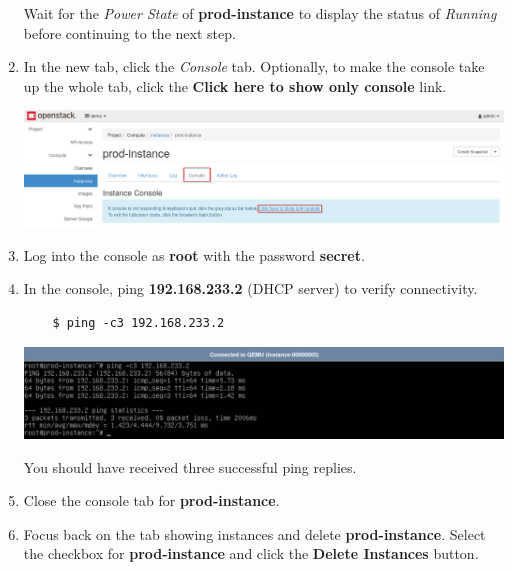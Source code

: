 \documentclass[letterpaper, 12pt]{article}
\begin{document}
\begin{enumerate}
    \begin{stopbox}
        Wait for the \textit{Power State} of \textbf{prod-instance} to display the status of \textit{Running} before
        continuing to the next step.
    \end{stopbox}

    \item In the new tab, click the \textit{Console} tab. Optionally, to make the console take up the whole tab, click
    the \textbf{Click here to show only console} link.
    
    \begin{center}
        \includegraphics[width=\linewidth]{images/part1/step10.png}
    \end{center}

    \item Log into the console as \textbf{root} with the password \textbf{secret}.

    \item In the console, ping \textbf{192.168.233.2} (DHCP server) to verify connectivity.
    \begin{lstlisting}
    $ ping -c3 192.168.233.2
    \end{lstlisting}

    \begin{center}
        \includegraphics[width=\linewidth]{images/part1/step12.png}
    \end{center}

    \begin{notebox}
        You should have received three successful ping replies.
    \end{notebox}

    \item Close the console tab for \textbf{prod-instance}.

    \item Focus back on the tab showing instances and delete \textbf{prod-instance}. Select the checkbox for
    \textbf{prod-instance} and click the \textbf{Delete Instances} button.


\end{enumerate}
\end{document}
